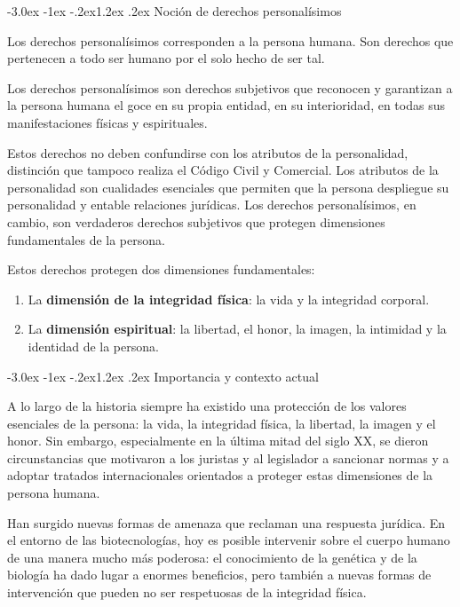 \documentclass[12pt,oneside]{book}
\makeatletter
\renewcommand\section{\@startsection{section}{1}{\z@}%
  {-3.0ex \@plus -1ex \@minus -.2ex}{1.2ex \@plus .2ex}%
  {\normalfont\large\bfseries\color{acento}}}
\makeatother
\begin{document}
\section{Noción de derechos personalísimos}

Los derechos personalísimos corresponden a la persona humana. Son derechos que pertenecen a todo ser humano por el solo hecho de ser tal.

\begin{definicion}
Los derechos personalísimos son derechos subjetivos que reconocen y garantizan a la persona humana el goce en su propia entidad, en su interioridad, en todas sus manifestaciones físicas y espirituales.
\end{definicion}

Estos derechos no deben confundirse con los atributos de la personalidad, distinción que tampoco realiza el Código Civil y Comercial. Los atributos de la personalidad son cualidades esenciales que permiten que la persona despliegue su personalidad y entable relaciones jurídicas. Los derechos personalísimos, en cambio, son verdaderos derechos subjetivos que protegen dimensiones fundamentales de la persona.

Estos derechos protegen dos dimensiones fundamentales:

\begin{enumerate}
    \item La \textbf{dimensión de la integridad física}: la vida y la integridad corporal.
    \item La \textbf{dimensión espiritual}: la libertad, el honor, la imagen, la intimidad y la identidad de la persona.
\end{enumerate}

\section{Importancia y contexto actual}

A lo largo de la historia siempre ha existido una protección de los valores esenciales de la persona: la vida, la integridad física, la libertad, la imagen y el honor. Sin embargo, especialmente en la última mitad del siglo XX, se dieron circunstancias que motivaron a los juristas y al legislador a sancionar normas y a adoptar tratados internacionales orientados a proteger estas dimensiones de la persona humana.

Han surgido nuevas formas de amenaza que reclaman una respuesta jurídica. En el entorno de las biotecnologías, hoy es posible intervenir sobre el cuerpo humano de una manera mucho más poderosa: el conocimiento de la genética y de la biología ha dado lugar a enormes beneficios, pero también a nuevas formas de intervención que pueden no ser respetuosas de la integridad física.
\end{document}
